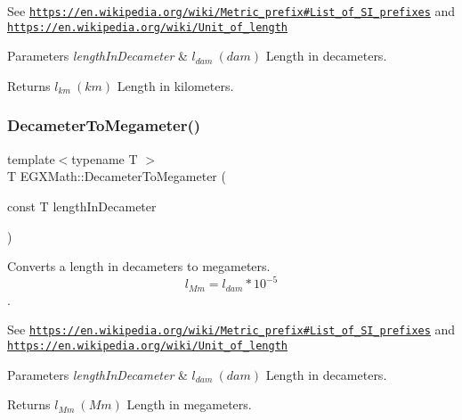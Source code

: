 See \href{https://en.wikipedia.org/wiki/Metric_prefix#List_of_SI_prefixes}{\tt https\+://en.\+wikipedia.\+org/wiki/\+Metric\+\_\+prefix\#\+List\+\_\+of\+\_\+\+S\+I\+\_\+prefixes} and \href{https://en.wikipedia.org/wiki/Unit_of_length}{\tt https\+://en.\+wikipedia.\+org/wiki/\+Unit\+\_\+of\+\_\+length} 
\begin{DoxyParams}{Parameters}
{\em length\+In\+Decameter} & $ l_{dam}\ (dam)$ Length in decameters. \\
\hline
\end{DoxyParams}
\begin{DoxyReturn}{Returns}
$ l_{km}\ (km)$ Length in kilometers. 
\end{DoxyReturn}
\mbox{\label{group___e_g_x_math-_conversions-_length_conversions-_decameter-_s_i_ga84e31290bf0886972b10479e4fd37fb4}} 
\subsubsection{\texorpdfstring{Decameter\+To\+Megameter()}{DecameterToMegameter()}}
{\footnotesize\ttfamily template$<$typename T $>$ \\
T E\+G\+X\+Math\+::\+Decameter\+To\+Megameter (\begin{DoxyParamCaption}\item[{const T}]{length\+In\+Decameter }\end{DoxyParamCaption})}



Converts a length in decameters to megameters. \[ l_{Mm}=l_{dam} * 10^{-5} \]. 

See \href{https://en.wikipedia.org/wiki/Metric_prefix#List_of_SI_prefixes}{\tt https\+://en.\+wikipedia.\+org/wiki/\+Metric\+\_\+prefix\#\+List\+\_\+of\+\_\+\+S\+I\+\_\+prefixes} and \href{https://en.wikipedia.org/wiki/Unit_of_length}{\tt https\+://en.\+wikipedia.\+org/wiki/\+Unit\+\_\+of\+\_\+length} 
\begin{DoxyParams}{Parameters}
{\em length\+In\+Decameter} & $ l_{dam}\ (dam)$ Length in decameters. \\
\hline
\end{DoxyParams}
\begin{DoxyReturn}{Returns}
$ l_{Mm}\ (Mm)$ Length in megameters. 
\end{DoxyReturn}
\mbox{\label{group___e_g_x_math-_conversions-_length_conversions-_decameter-_s_i_gac7f762a09c6496efaab29ecdbfb88a2c}} 
